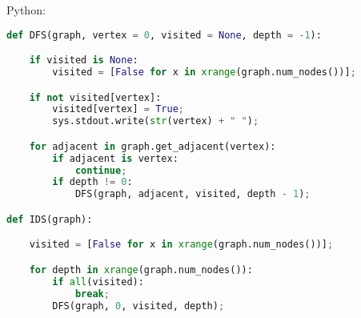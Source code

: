 Python:
\begin{lstlisting}[language=Python]
def DFS(graph, vertex = 0, visited = None, depth = -1):

    if visited is None:
        visited = [False for x in xrange(graph.num_nodes())];

    if not visited[vertex]:
        visited[vertex] = True;
        sys.stdout.write(str(vertex) + " ");

    for adjacent in graph.get_adjacent(vertex):
        if adjacent is vertex:
            continue;
        if depth != 0:
            DFS(graph, adjacent, visited, depth - 1);

def IDS(graph):

    visited = [False for x in xrange(graph.num_nodes())];

    for depth in xrange(graph.num_nodes()):
        if all(visited):
            break;
        DFS(graph, 0, visited, depth);
\end{lstlisting}
